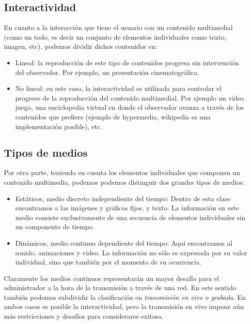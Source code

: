 \documentclass[12pt]{article}
\begin{document}
\subsection*{Interactividad}
En cuanto a la interacción que tiene el usuario con un contenido 
multimedial (como un todo, es decir un conjunto de elementos individuales
como texto, imagen, etc), podemos dividir dichos contenidos en: 
\begin{itemize}
\item Lineal: la reproducción de este tipo de contenidos progresa 
sin intervención del observador. Por ejemplo, un presentación cinematográfica.  
\item No lineal: en este caso, la interactividad es utilizada para 
controlar el progreso de la reproducción del contenido multimedial. Por 
ejemplo un video juego, una enciclopedia virtual en donde el observador
avanza a través de los contenidos que prefiere (ejemplo de hypermedia, 
wikipedia es una implementación posible), etc. 
\end{itemize}

\subsection*{Tipos de medios}
Por otra parte, teniendo en cuenta los elementos individuales que componen un 
contenido multimedia, podemos podemos distinguir dos grandes tipos de medios: 

\begin{itemize}
\item{Estáticos, medio discreto independiente del tiempo}: 
Dentro de esta clase encontramos a las imágenes y gráficos fijos, y texto. La información 
en este medio consiste exclusivamente de una secuencia de elementos individuales 
sin un componente de tiempo.
\item{Dinámicos, medio continuo dependiente del tiempo}: 
Aquí encontramos al sonido, animaciones y video. La información no sólo es 
expresada por su valor individual, sino que también por el momento 
de su ocurrencia.
\end{itemize}

Claramente los medios continuos representarán un mayor desafío para el 
administrador a la hora de la transmisión a través de una red. En este 
sentido también podemos subdividir la clasificación en {\it transmisión
en vivo o grabada}. En ambos casos es posible la interactividad, pero 
la transmisión en vivo impone aún más restricciones y desafíos para 
considerarse exitosa. 
\end{document}
